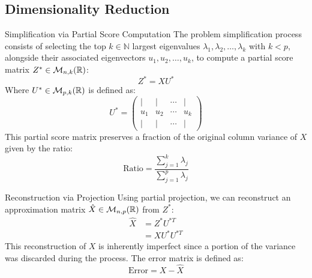 \subsection[Dimensionality Reduction]{Dimensionality Reduction}

\begin{frame}{Simplification via Partial Score Computation}
	The problem simplification process consists of selecting the top $k \in \mathbb{N}$ largest eigenvalues $\lambda_1, \lambda_2, \dots, \lambda_k$ with $k < p$, alongside their associated eigenvectors $u_1, u_2, \dots, u_k$, to compute a partial score matrix $Z^* \in \mathcal{M}_{n,k}(\mathbb{R})$:
	\begin{equation}
		Z^* = X U^*
		\nonumber
	\end{equation}
	Where $U^* \in \mathcal{M}_{p,k}(\mathbb{R})$ is defined as:
	\begin{equation}
		U^* = \begin{pmatrix}
			\vert & \vert & \cdots & \vert \\
			u_1   & u_2   & \cdots & u_k   \\
			\vert & \vert & \cdots & \vert
		\end{pmatrix}
		\nonumber
	\end{equation}
	This partial score matrix preserves a fraction of the original column variance of $X$ given by the ratio:
	\begin{equation}
		\text{Ratio} = \frac{\sum_{j=1}^k \lambda_j}{\sum_{j=1}^p \lambda_j}
		\nonumber
	\end{equation}
\end{frame}

\begin{frame}{Reconstruction via Projection}
	Using partial projection, we can reconstruct an approximation matrix $\hat{X} \in \mathcal{M}_{n,p}(\mathbb{R})$ from $Z^*$:
	\begin{equation}
		\begin{aligned}
			\hat{X} &= Z^* U^{*T} \\
			&= X U^* U^{*T}
		\end{aligned}
		\nonumber
	\end{equation}
	\pause
	This reconstruction of $X$ is inherently imperfect since a portion of the variance was discarded during the process. The error matrix is defined as:
	\begin{equation}
		\text{Error} = X - \hat{X}
		\nonumber
	\end{equation}
\end{frame}

